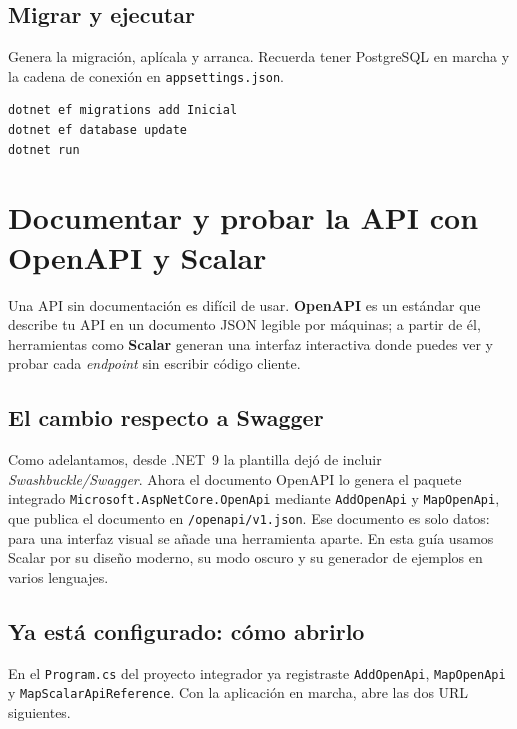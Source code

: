 \documentclass[11pt]{article}
\begin{document}
\subsection{Migrar y ejecutar}
Genera la migración, aplícala y arranca. Recuerda tener PostgreSQL en marcha y la cadena de conexión en \texttt{appsettings.json}.

\begin{cajacodigo}
\begin{lstlisting}[style=shell]
dotnet ef migrations add Inicial
dotnet ef database update
dotnet run
\end{lstlisting}
\end{cajacodigo}

\section{Documentar y probar la API con OpenAPI y Scalar}
Una API sin documentación es difícil de usar. \textbf{OpenAPI} es un estándar que describe tu API en un documento JSON legible por máquinas; a partir de él, herramientas como \textbf{Scalar} generan una interfaz interactiva donde puedes ver y probar cada \emph{endpoint} sin escribir código cliente.

\subsection{El cambio respecto a Swagger}
Como adelantamos, desde .NET~9 la plantilla dejó de incluir \emph{Swashbuckle/Swagger}. Ahora el documento OpenAPI lo genera el paquete integrado \texttt{Microsoft.AspNetCore.OpenApi} mediante \texttt{AddOpenApi} y \texttt{MapOpenApi}, que publica el documento en \texttt{/openapi/v1.json}. Ese documento es solo datos: para una interfaz visual se añade una herramienta aparte. En esta guía usamos Scalar por su diseño moderno, su modo oscuro y su generador de ejemplos en varios lenguajes.

\subsection{Ya está configurado: cómo abrirlo}
En el \texttt{Program.cs} del proyecto integrador ya registraste \texttt{AddOpenApi}, \texttt{MapOpenApi} y \texttt{MapScalar\allowbreak{}ApiReference}. Con la aplicación en marcha, abre las dos URL siguientes.
\end{document}
